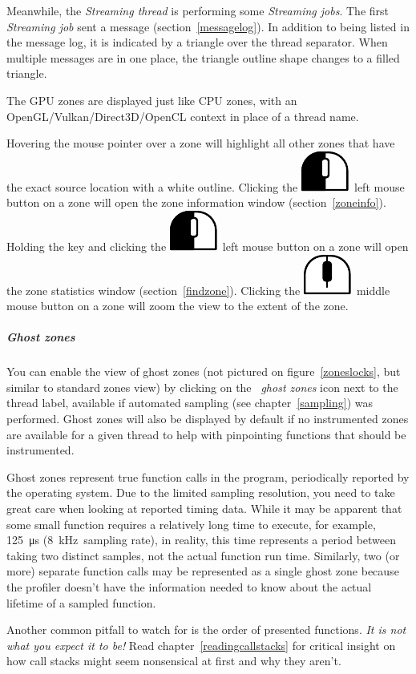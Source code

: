 \documentclass[hidelinks,titlepage,a4paper]{article}
\newcommand{\LMB}{\includegraphics[height=.8\baselineskip]{icons/lmb}}
\newcommand{\MMB}{\includegraphics[height=.8\baselineskip]{icons/mmb}}
\begin{document}
Meanwhile, the \emph{Streaming thread} is performing some \emph{Streaming jobs}. The first \emph{Streaming job} sent a message (section~\ref{messagelog}). In addition to being listed in the message log, it is indicated by a triangle over the thread separator. When multiple messages are in one place, the triangle outline shape changes to a filled triangle.

The GPU zones are displayed just like CPU zones, with an OpenGL/Vulkan/Direct3D/OpenCL context in place of a thread name.

Hovering the \faMousePointer{} mouse pointer over a zone will highlight all other zones that have the exact source location with a white outline. Clicking the \LMB{}~left mouse button on a zone will open the zone information window (section~\ref{zoneinfo}). Holding the \keys{\ctrl} key and clicking the \LMB{}~left mouse button on a zone will open the zone statistics window (section~\ref{findzone}). Clicking the \MMB{}~middle mouse button on a zone will zoom the view to the extent of the zone.

\subparagraph{Ghost zones}

You can enable the view of ghost zones (not pictured on figure~\ref{zoneslocks}, but similar to standard zones view) by clicking on the \emph{\faGhost{}~ghost zones} icon next to the thread label, available if automated sampling (see chapter~\ref{sampling}) was performed. Ghost zones will also be displayed by default if no instrumented zones are available for a given thread to help with pinpointing functions that should be instrumented.

Ghost zones represent true function calls in the program, periodically reported by the operating system. Due to the limited sampling resolution, you need to take great care when looking at reported timing data. While it may be apparent that some small function requires a relatively long time to execute, for example, 125~\si{\micro\second} (8~kHz~sampling rate), in reality, this time represents a period between taking two distinct samples, not the actual function run time. Similarly, two (or more) separate function calls may be represented as a single ghost zone because the profiler doesn't have the information needed to know about the actual lifetime of a sampled function.

Another common pitfall to watch for is the order of presented functions. \emph{It is not what you expect it to be!} Read chapter~\ref{readingcallstacks} for critical insight on how call stacks might seem nonsensical at first and why they aren't.
\end{document}
